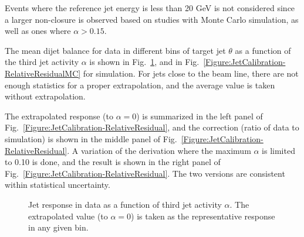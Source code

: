 Events where the reference jet energy is less than 20 GeV is not considered since a larger non-closure is observed based on studies with Monte Carlo simulation, as well as ones where $\alpha > 0.15$.

The mean dijet balance for data in different bins of target jet $\theta$ as a function of the third jet activity $\alpha$ is shown in Fig.~\ref{Figure:JetCalibration-RelativeResidualData}, and in Fig.~\ref{Figure:JetCalibration-RelativeResidualMC} for simulation.  For jets close to the beam line, there are not enough statistics for a proper extrapolation, and the average value is taken without extrapolation.

The extrapolated response (to $\alpha = 0$) is summarized in the left panel of Fig.~\ref{Figure:JetCalibration-RelativeResidual}, and the correction (ratio of data to simulation) is shown in the middle panel of Fig.~\ref{Figure:JetCalibration-RelativeResidual}.  A variation of the derivation where the maximum $\alpha$ is limited to 0.10 is done, and the result is shown in the right panel of Fig.~\ref{Figure:JetCalibration-RelativeResidual}.  The two versions are consistent within statistical uncertainty.


\begin{figure}[htp!]
    \centering
    \caption{Jet response in data as a function of third jet activity $\alpha$.  The extrapolated value (to $\alpha = 0$) is taken as the representative response in any given bin.}
    \label{Figure:JetCalibration-RelativeResidualData}
\end{figure}

